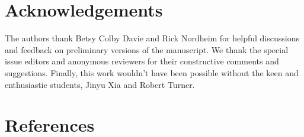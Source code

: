\documentclass[
]{article}
\begin{document}
\hypertarget{acknowledgements}{%
\section{Acknowledgements}\label{acknowledgements}}

The authors thank Betsy Colby Davie and Rick Nordheim for helpful discussions and
feedback on preliminary versions of the manuscript. We thank the special issue
editors and anonymous reviewers for their constructive comments and suggestions. Finally, this work wouldn't have been possible without the keen and enthusiastic students, Jinyu Xia and Robert Turner.

\hypertarget{references}{%
\section{References}\label{references}}
\end{document}
